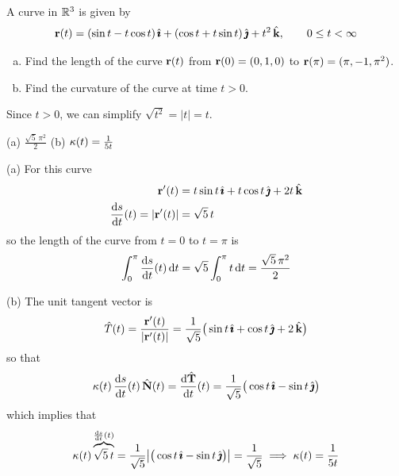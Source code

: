 \begin{question}[M317 2016D] %
A curve in $\mathbb{R}^3$ is given by
\begin{equation*}
\mathbf{r}(t) = (\sin t - t \cos t)\,\hat{\pmb{\imath}} + (\cos t + t \sin t)\,\hat{\pmb{\jmath}} + t^2\,\hat{\mathbf{k}},
\qquad
0 \le t < \infty
\end{equation*}
\begin{enumerate}[(a)]
\item
Find the length of the curve $\mathbf{r}(t)$ from $\mathbf{r}(0) = (0, 1, 0)$ to 
$\mathbf{r}(\pi) = (\pi, -1, \pi^2)$.
\item
Find the curvature of the curve at time $t > 0$.
\end{enumerate}
\end{question}

\begin{hint} 
Since $t>0$, we can simplify $\sqrt{t^2}=|t|=t$.
\end{hint}

\begin{answer} 
(a) $\frac{\sqrt{5}\,\pi^2}{2}$\qquad
(b) $\kappa(t) = \frac{1}{5t}$
\end{answer}

\begin{solution} (a) For this curve
\begin{align*}
\vr'(t) &= t\sin t\,\hi + t\cos t\,\hj +2t\,\hk \\
\diff{s}{t}(t)=|\vr'(t)| &= \sqrt{5} \,t
\end{align*}
so the length of the curve from $t=0$ to $t=\pi$ is
\begin{align*}
\int_0^\pi \diff{s}{t}(t)\, \dee{t}
=\sqrt{5} \int_0^\pi t\, \dee{t}
=\frac{\sqrt{5}\,\pi^2}{2}
\end{align*}

(b) The unit tangent vector is
\begin{equation*}
\hat T(t) = \frac{\mathbf{r}'(t)}{|\mathbf{r}'(t)|} 
     = \frac{1}{\sqrt{5}}\big(\sin t\,\hat{\pmb{\imath}} + \cos t\,\hat{\pmb{\jmath}} +2\,\hat{\mathbf{k}}\big)
\end{equation*}
so that
\begin{align*}
\ka(t)\,\diff{s}{t}(t)\,\hat\vN(t) = \diff{\hat\vT}{t}(t)
=\frac{1}{\sqrt{5}}\big(\cos t\,\hi - \sin t\,\hj \big)
\end{align*}
which implies that
\begin{align*}
\ka(t)\overbrace{\sqrt{5}\, t}^{\diff{s}{t}(t)}
=\frac{1}{\sqrt{5}}\big|\big(\cos t\,\hi - \sin t\,\hj \big)\big|
=\frac{1}{\sqrt{5}}
\implies  \ka(t) = \frac{1}{5t}
\end{align*}
\end{solution}




